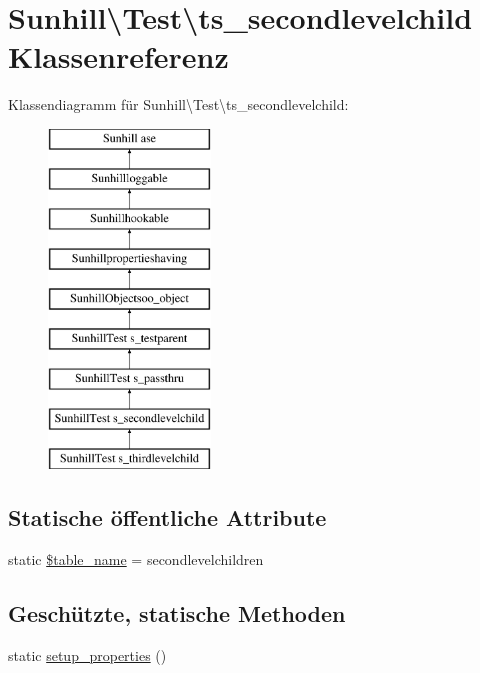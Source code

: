 \hypertarget{classSunhill_1_1Test_1_1ts__secondlevelchild}{}\section{Sunhill\textbackslash{}Test\textbackslash{}ts\+\_\+secondlevelchild Klassenreferenz}
\label{classSunhill_1_1Test_1_1ts__secondlevelchild}
Klassendiagramm für Sunhill\textbackslash{}Test\textbackslash{}ts\+\_\+secondlevelchild\+:\begin{figure}[H]
\begin{center}
\leavevmode
\includegraphics[height=9.000000cm]{dd/dab/classSunhill_1_1Test_1_1ts__secondlevelchild}
\end{center}
\end{figure}
\subsection*{Statische öffentliche Attribute}
\begin{DoxyCompactItemize}
\item 
static \hyperlink{classSunhill_1_1Test_1_1ts__secondlevelchild_af875263aea771f91207b409e0cef16c0}{\$table\+\_\+name} = \textquotesingle{}secondlevelchildren\textquotesingle{}
\end{DoxyCompactItemize}
\subsection*{Geschützte, statische Methoden}
\begin{DoxyCompactItemize}
\item 
static \hyperlink{classSunhill_1_1Test_1_1ts__secondlevelchild_a074473306bd4cbc734058abb1c055376}{setup\+\_\+properties} ()
\end{DoxyCompactItemize}
